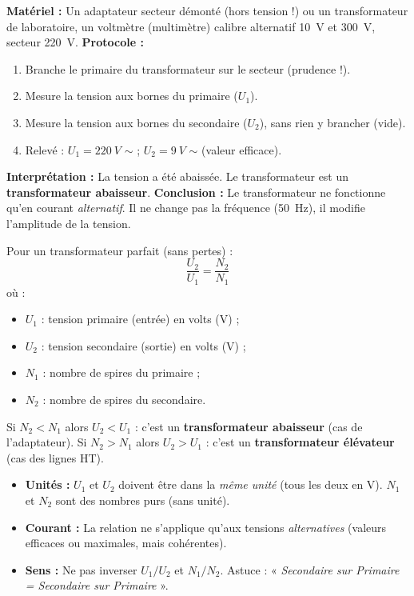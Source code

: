 \documentclass[11pt]{article}
\begin{document}
\begin{experience}
\textbf{Matériel :} Un adaptateur secteur démonté (hors tension !) ou un transformateur de laboratoire, un voltmètre (multimètre) calibre alternatif \SI{10}{V} et \SI{300}{V}, secteur \SI{220}{V}.
\textbf{Protocole :}
\begin{enumerate}
\item Branche le primaire du transformateur sur le secteur (prudence !).
\item Mesure la tension aux bornes du primaire ($U_1$).
\item Mesure la tension aux bornes du secondaire ($U_2$), sans rien y brancher (vide).
\item Relevé : $U_1 = \SI{220}{V}$ $\sim$ ; $U_2 = \SI{9}{V}$ $\sim$ (valeur efficace).
\end{enumerate}
\textbf{Interprétation :} La tension a été abaissée. Le transformateur est un \textbf{transformateur abaisseur}.
\textbf{Conclusion :} Le transformateur ne fonctionne qu'en courant \emph{alternatif}. Il ne change pas la fréquence (\SI{50}{Hz}), il modifie l'amplitude de la tension.
\end{experience}

\begin{propriete}
Pour un transformateur parfait (sans pertes) :
\[
\frac{U_2}{U_1} = \frac{N_2}{N_1}
\]
où :
\begin{itemize}
\item $U_1$ : tension primaire (entrée) en volts (V) ;
\item $U_2$ : tension secondaire (sortie) en volts (V) ;
\item $N_1$ : nombre de spires du primaire ;
\item $N_2$ : nombre de spires du secondaire.
\end{itemize}
Si $N_2 < N_1$ alors $U_2 < U_1$ : c'est un \textbf{transformateur abaisseur} (cas de l'adaptateur).
Si $N_2 > N_1$ alors $U_2 > U_1$ : c'est un \textbf{transformateur élévateur} (cas des lignes HT).
\end{propriete}

\begin{attention}
\begin{itemize}
\item \textbf{Unités :} $U_1$ et $U_2$ doivent être dans la \emph{même unité} (tous les deux en V). $N_1$ et $N_2$ sont des nombres purs (sans unité).
\item \textbf{Courant :} La relation ne s'applique qu'aux tensions \emph{alternatives} (valeurs efficaces ou maximales, mais cohérentes).
\item \textbf{Sens :} Ne pas inverser $U_1/U_2$ et $N_1/N_2$. Astuce : « \emph{Secondaire sur Primaire = Secondaire sur Primaire} ».
\end{itemize}
\end{attention}
\end{document}
